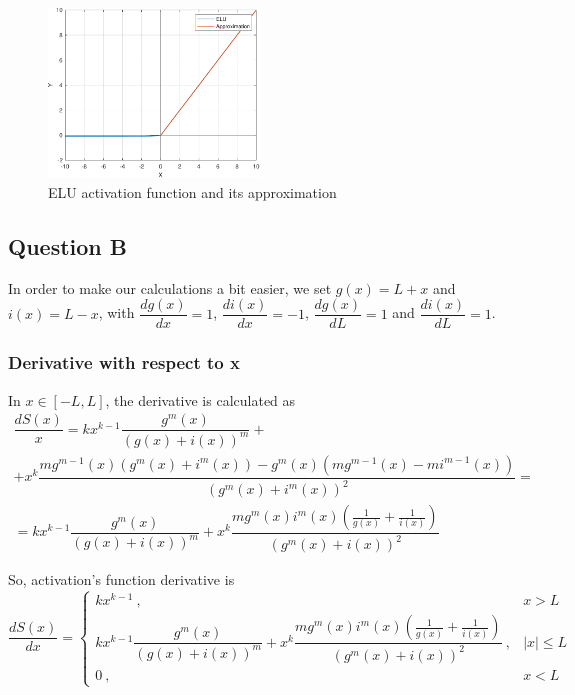 \begin{figure}[H]
	\centering
	\includegraphics[width=0.5\textwidth]{../Problem 7/prob7_elu.pdf}
	\caption{ELU activation function and its approximation}
	\label{fig:prob7_elu}
\end{figure}


\subsection{Question B}
In order to make our calculations a bit easier, we set $g(x) = L+x$ and $i(x) = L-x$, with $\dfrac{dg(x)}{dx} = 1$, $\dfrac{di(x)}{dx} = -1$, $\dfrac{dg(x)}{dL} = 1$ and $\dfrac{di(x)}{dL} = 1$.

\subsubsection{Derivative with respect to x}
In $x \in \left[-L, L\right]$, the derivative is calculated as
\[
\begin{gathered}
\dfrac{dS(x)}{x} = kx^{k-1} \dfrac{g^m(x)}{\left(g(x)+i(x)\right)^m} + \\[1mm]
+ x^k\dfrac{mg^{m-1}(x) \left( g^m(x) + i^m(x) \right) - g^m(x) \left( mg^{m-1}(x) - mi^{m-1}(x)\right)}{\left( g^m(x) + i^m(x) \right)^2} = \\[1mm]
= kx^{k-1} \dfrac{g^m(x)}{\left(g(x)+i(x)\right)^m} + x^k \dfrac{mg^m(x) i^m(x) \left( \frac{1}{g(x)} + \frac{1}{i(x)} \right)}{\left(g^m(x) + i(x)\right)^2}
\end{gathered}
\]

So, activation's function derivative is 
\begin{equation}
\frac{dS(x)}{dx} = \left\{
\begin{array}{cc}
	kx^{k-1} \ , & x>L\\[1mm]
	kx^{k-1} \dfrac{g^m(x)}{\left(g(x)+i(x)\right)^m} + x^k \dfrac{mg^m(x) i^m(x) \left( \frac{1}{g(x)} + \frac{1}{i(x)} \right)}{\left(g^m(x) + i(x)\right)^2}\ , & \left|x\right| \le L\\[1mm]
	0\ , & x<L
\end{array}
\right.
\end{equation}


